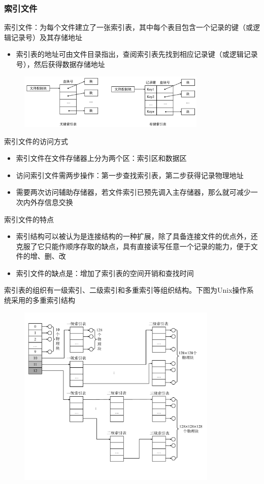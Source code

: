 \documentclass[cs4size,a4paper,10pt]{ctexart}
\begin{document}
	\subsubsection{索引文件}
	索引文件：为每个文件建立了一张索引表，其中每个表目包含一个记录的键（或逻辑记录号）及其存储地址
	\begin{itemize}
		\item 索引表的地址可由文件目录指出，查阅索引表先找到相应记录键（或逻辑记录号），然后获得数据存储地址
	\end{itemize}
	\begin{figure}[H]
		\centering
		\includegraphics[width=0.8\textwidth]{img/5.2.4.4.1}
	\end{figure}

	索引文件的访问方式
	\begin{itemize}
		\item 索引文件在文件存储器上分为两个区：索引区和数据区
		\item 访问索引文件需两步操作：第一步查找索引表，第二步获得记录物理地址
		\item 需要两次访问辅助存储器，若文件索引已预先调入主存储器，那么就可减少一次内外存信息交换
	\end{itemize}

	索引文件的特点
	\begin{itemize}
		\item 索引结构可以被认为是连接结构的一种扩展，除了具备连接文件的优点外，还克服了它只能作顺序存取的缺点，具有直接读写任意一个记录的能力，便于文件的增、删、改
		\item 索引文件的缺点是：增加了索引表的空间开销和查找时间
	\end{itemize}

	索引表的组织有一级索引、二级索引和多重索引等组织结构。下图为Unix操作系统采用的多重索引结构
	\begin{figure}[H]
		\centering
		\includegraphics[width=0.85\textwidth]{img/5.2.4.4.2}
	\end{figure}
\end{document}

